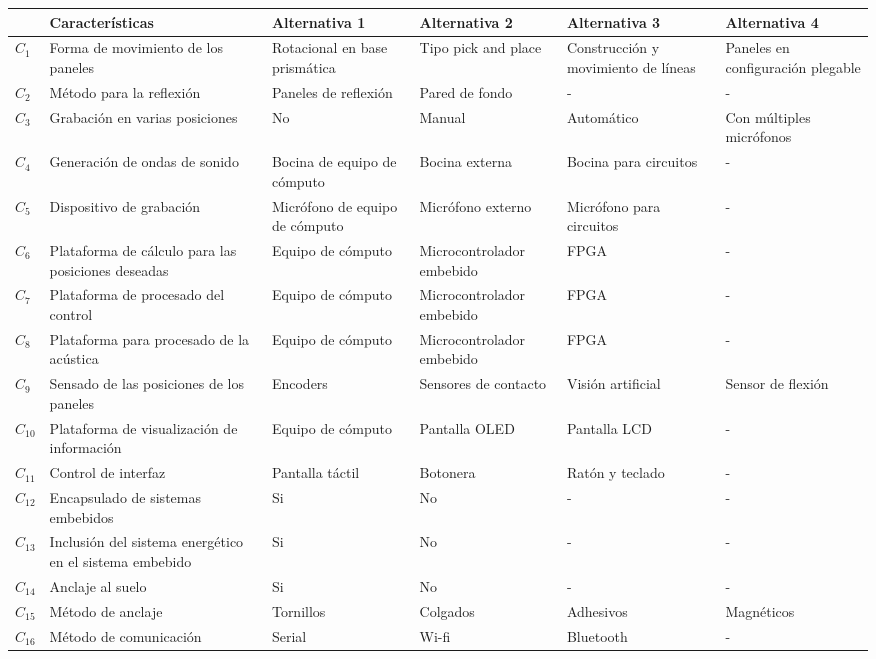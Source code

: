 \begin{center}
\scriptsize
\centering
    \begin{longtable}[!htb]{|>{\centering\arraybackslash}m{3em} ||>{\centering\arraybackslash}m{8em} | >{\centering\arraybackslash}m{8em}| >{\centering\arraybackslash}m{8em}| >{\centering\arraybackslash}m{8em}|>{\centering\arraybackslash}m{8em}|}
    \hline
    & \textbf{Características} & \textbf{Alternativa 1} & \textbf{Alternativa 2}& \textbf{Alternativa 3}& \textbf{Alternativa 4}\\
    \hline\hline
    \textbf{$C_1$} & Forma de movimiento de los paneles & Rotacional en base prismática & Tipo pick and place & Construcción y movimiento de líneas & Paneles en configuración plegable\\
    \hline
    \textbf{$C_2$} & Método para la reflexión & Paneles de reflexión & Pared de fondo & - & -\\
    \hline
    \textbf{$C_3$} & Grabación en varias posiciones & No & Manual & Automático & Con múltiples micrófonos\\
    \hline
    \textbf{$C_4$} & Generación de ondas de sonido & Bocina de equipo de cómputo & Bocina externa & Bocina para circuitos & - \\
    \hline
    \textbf{$C_5$} & Dispositivo de grabación & Micrófono de equipo de cómputo & Micrófono externo & Micrófono para circuitos & - \\
    \hline
    \textbf{$C_6$} & Plataforma de cálculo para las posiciones deseadas & Equipo de cómputo & Microcontrolador embebido & FPGA & - \\
    \hline
    \textbf{$C_7$} & Plataforma de procesado del control & Equipo de cómputo & Microcontrolador embebido & FPGA & - \\
    \hline
    \textbf{$C_8$} & Plataforma para procesado de la acústica & Equipo de cómputo & Microcontrolador embebido & FPGA & - \\
    \hline
    \textbf{$C_9$} & Sensado de las posiciones de los paneles & Encoders & Sensores de contacto & Visión artificial & Sensor de flexión \\
    \hline
    \textbf{$C_{10}$} & Plataforma de visualización de información & Equipo de cómputo & Pantalla OLED & Pantalla LCD & - \\
    \hline
    \textbf{$C_{11}$} & Control de interfaz & Pantalla táctil & Botonera & Ratón y teclado & - \\
    \hline
    \textbf{$C_{12}$} & Encapsulado de sistemas embebidos & Si & No & - & - \\
    \hline
    \textbf{$C_{13}$} & Inclusión del sistema energético en el sistema embebido & Si & No & - & - \\
    \hline
    \textbf{$C_{14}$} & Anclaje al suelo & Si & No & - & - \\
    \hline
    \textbf{$C_{15}$} & Método de anclaje & Tornillos & Colgados & Adhesivos & Magnéticos \\
    \hline
    \textbf{$C_{16}$} & Método de comunicación & Serial & Wi-fi & Bluetooth & - \\
    \hline


\end{longtable}
\end{center}
